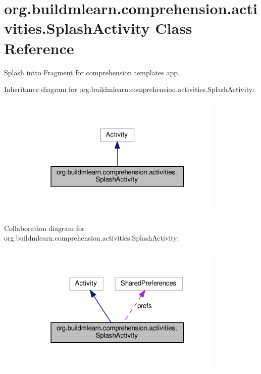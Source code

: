 \hypertarget{classorg_1_1buildmlearn_1_1comprehension_1_1activities_1_1SplashActivity}{}\section{org.\+buildmlearn.\+comprehension.\+activities.\+Splash\+Activity Class Reference}
\label{classorg_1_1buildmlearn_1_1comprehension_1_1activities_1_1SplashActivity}


Splash intro Fragment for comprehension template\textquotesingle{}s app.  




Inheritance diagram for org.\+buildmlearn.\+comprehension.\+activities.\+Splash\+Activity\+:
\nopagebreak
\begin{figure}[H]
\begin{center}
\leavevmode
\includegraphics[width=277pt]{classorg_1_1buildmlearn_1_1comprehension_1_1activities_1_1SplashActivity__inherit__graph}
\end{center}
\end{figure}


Collaboration diagram for org.\+buildmlearn.\+comprehension.\+activities.\+Splash\+Activity\+:
\nopagebreak
\begin{figure}[H]
\begin{center}
\leavevmode
\includegraphics[width=277pt]{classorg_1_1buildmlearn_1_1comprehension_1_1activities_1_1SplashActivity__coll__graph}
\end{center}
\end{figure}
